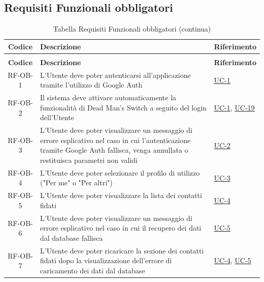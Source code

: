 \documentclass[a4paper,12pt]{article}
\begin{document}
\subsection{Requisiti Funzionali obbligatori} \label{subsection:requisiti_funzionali_obbligatori}
\begin{center}
\renewcommand{\arraystretch}{1.5}

\begin{longtable}{|c|p{8.5cm}|>{\centering\arraybackslash}p{4cm}|}

\hline
\rowcolor{gray!60}
\textbf{Codice} & \textbf{Descrizione} & \textbf{Riferimento} \\
\hline
\endfirsthead
\caption[]{Tabella Requisiti Funzionali obbligatori (continua)} \\
\hline
\rowcolor{gray!60}
\textbf{Codice} & \textbf{Descrizione} & \textbf{Riferimento} \\
\hline
\endhead


RF-OB-1 & L'Utente deve poter autenticarsi all'applicazione tramite l'utilizzo di Google Auth & \hyperref[subsec:UC-1]{UC-1} \\
\hline

RF-OB-2 & Il sistema deve attivare automaticamente la funzionalità di Dead Man's Switch a seguito del login dell'Utente & \hyperref[subsec:UC-1]{UC-1}, \hyperref[sec:UC-19]{UC-19} \\
\hline

RF-OB-3 & L'Utente deve poter visualizzare un messaggio di errore esplicativo nel caso in cui l'autenticazione tramite Google Auth fallisca, venga annullata o restituisca parametri non validi & \hyperref[subsec:UC-2]{UC-2} \\
\hline

RF-OB-4 & L'Utente deve poter selezionare il profilo di utilizzo ("Per me" o "Per altri") & \hyperref[subsec:UC-3]{UC-3} \\
\hline

RF-OB-5 & L'Utente deve poter visualizzare la lista dei contatti fidati & \hyperref[sec:UC-4]{UC-4} \\
\hline

RF-OB-6 & L'Utente deve poter visualizzare un messaggio di errore esplicativo nel caso in cui il recupero dei dati dal database fallisca & \hyperref[sec:UC-5]{UC-5} \\
\hline

RF-OB-7 & L'Utente deve poter ricaricare la sezione dei contatti fidati dopo la visualizzazione dell'errore di caricamento dei dati dal database & \hyperref[sec:UC-4]{UC-4}, \hyperref[sec:UC-5]{UC-5} \\
\hline


\end{longtable}
\end{center}
\end{document}
